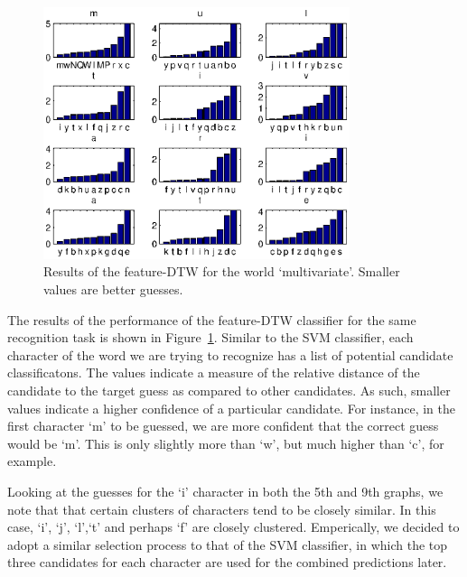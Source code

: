 \documentclass[12pt]{article}
\begin{document}
	\begin{figure}[htbp!]
	\centering
	\includegraphics[width=0.8\textwidth]{dtw_result.eps}
	\caption{Results of the feature-DTW for the world `multivariate'. Smaller values are better guesses.}
	\label{figure:dtw_result}
	\end{figure}
	
	The results of the performance of the feature-DTW classifier for the same recognition task is shown in Figure~\ref{figure:dtw_result}. Similar to the SVM classifier, each character of the word we are trying to recognize has a list of potential candidate classificatons. The values indicate a measure of the relative distance of the candidate to the target guess as compared to other candidates. As such, smaller values indicate a higher confidence of a particular candidate. For instance, in the first character `m' to be guessed, we are more confident that the correct guess would be `m'. This is only slightly more than `w', but much higher than `c', for example. 
	
	Looking at the guesses for the `i' character in both the 5th and 9th graphs, we note that that certain clusters of characters tend to be closely similar. In this case, `i', `j', `l',`t' and perhaps `f' are closely clustered. Emperically, we decided to adopt a similar selection process to that of the SVM classifier, in which the top three candidates for each character are used for the combined predictions later.
	
\end{document}
